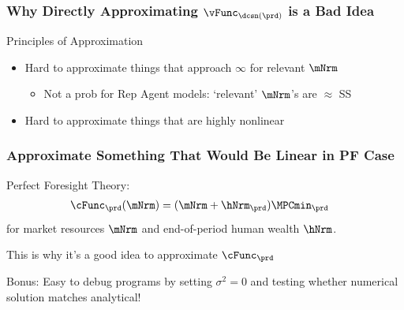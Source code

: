 \documentclass{beamer}
\begin{document}
\begin{frame}
\frametitle{Why Directly Approximating $\vFunc_{\dcsn(\prd)}$ is a Bad Idea}

Principles of Approximation

\begin{itemize}
\item Hard to approximate things that approach $\infty$ for relevant $\mNrm$
\begin{itemize}
\item Not a prob for Rep Agent models: `relevant' $\mNrm$'s are $\approx$ SS
\end{itemize}
\item Hard to approximate things that are highly nonlinear 
\end{itemize}


\end{frame}


\begin{frame}
\frametitle{Approximate Something That Would Be Linear in PF Case}

\medskip

Perfect Foresight Theory:
\begin{equation}\begin{gathered}\begin{aligned}
  \cFunc_{\prd}(\mNrm)  & = (\mNrm+\hNrm_{\prd})\MPCmin_{\prd} 
\end{aligned}\end{gathered}\end{equation}
for market resources $\mNrm$ and end-of-period human wealth $\hNrm$.


\medskip\medskip
\pause 

This is why it's a good idea to approximate $\cFunc_{\prd}$ 

\pause \medskip\medskip

Bonus: Easy to debug programs by setting $\sigma^{2} = 0$ and
testing whether numerical solution matches analytical!

\end{frame}
\end{document}
